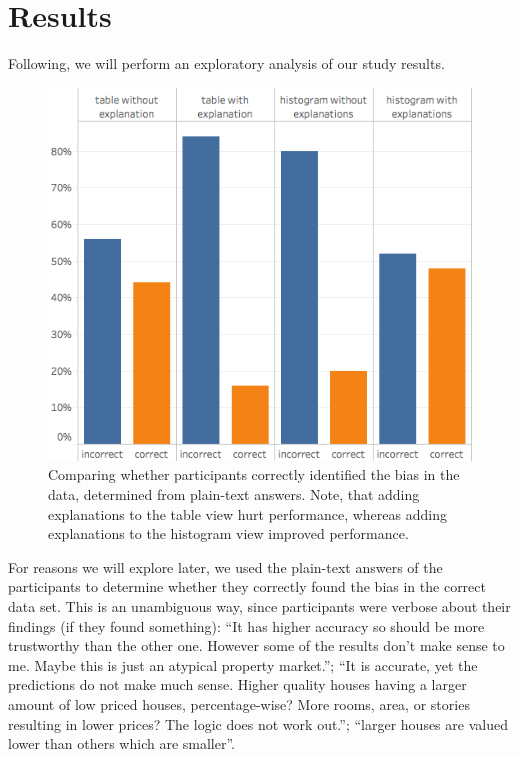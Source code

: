 \section{Results}
\label{sec:results}
Following, we will perform an exploratory analysis of our study results.

\begin{figure}
\centering
\includegraphics[width=0.5\linewidth]{aggexplain/correctness}
\caption[Comparing whether participants correctly identified the bias.]{
Comparing whether participants correctly identified the bias in the data, determined from plain-text answers. Note, that adding explanations to the table view hurt performance, whereas adding explanations to the histogram view improved performance.
}
\label{figs:correctness}
\end{figure}

For reasons we will explore later, we used the plain-text answers of the participants to determine whether they correctly found the bias in the correct data set.
This is an unambiguous way, since participants were verbose about their findings (if they found something):
``It has higher accuracy so should be more trustworthy than the other one. However some of the results don't make sense to me. Maybe this is just an atypical property market.'';
``It is accurate, yet the predictions do not make much sense. Higher quality houses having a larger amount of low priced houses, percentage-wise? More rooms, area, or stories resulting in lower prices? The logic does not work out.'';
``larger houses are valued lower than others which are smaller''.


